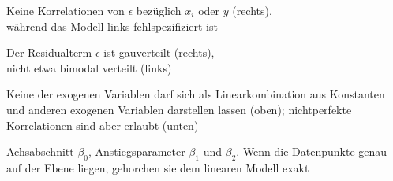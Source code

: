 \documentclass[a4paper]{foils}
\begin{document}
\begin{landscape}
\begin{center}
\newpage
\vspace{2em}
\vspace{2em}
Keine Korrelationen von $\epsilon$ bez\"uglich $x_i$ oder $y$
(rechts),\\ w\"ahrend das Modell links fehlspezifiziert ist

\newpage
\vspace{2em}
\vspace{2em}
Der Residualterm $\epsilon$ ist gau\3verteilt (rechts),\\
nicht etwa bimodal verteilt (links) 


\newpage
\vspace{1em}

Keine der exogenen Variablen darf sich als Linearkombination aus
Konstanten und anderen exogenen Variablen darstellen lassen (oben);
nichtperfekte Korrelationen sind aber erlaubt (unten)


\newpage

\vspace{2em}

Achsabschnitt $\beta_0$, Anstiegsparameter $\beta_1$ und $\beta_2$. Wenn die Datenpunkte genau auf der Ebene liegen, gehorchen sie dem linearen Modell exakt



\newpage
\vspace{1em}

\newpage
\vspace{2em}



\end{center}
\end{landscape}
\end{document}
